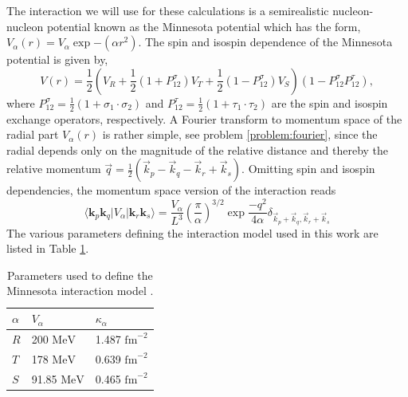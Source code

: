 The interaction we will use for these calculations is a semirealistic nucleon-nucleon potential known as the Minnesota potential \cite{minnesota} which has the form, $V_{\alpha}\left( r\right)=V_{\alpha}\exp{-(\alpha r^{2})}$. The spin and isospin dependence of the Minnesota potential is given by,
\begin{equation}
V\left( r\right)=\frac{1}{2}\left( V_{R}+\frac{1}{2}\left( 1+P_{12}^{\sigma}\right) V_{T}+\frac{1}{2}\left( 1-P_{12}^{\sigma}\right) V_{S}\right)\left( 1-P_{12}^{\sigma}P_{12}^{\tau}\right),
\end{equation}
where $P_{12}^{\sigma}=\frac{1}{2}\left( 1+\sigma_{1}\cdot\sigma_{2}\right)$ and $P_{12}^{\tau}=\frac{1}{2}\left( 1+\tau_{1}\cdot\tau_{2}\right)$ are the spin and isospin exchange operators, respectively. A Fourier transform to momentum space of the radial part $V_{\alpha}\left( r\right)$ is rather simple, see problem \ref{problem:fourier}, since  the radial depends only on the magnitude of the relative distance and thereby the relative momentum $\vec{q}=\frac{1}{2}\left(\vec{k}_{p}-\vec{k}_{q}-\vec{k}_{r}+\vec{k}_{s}\right)$. Omitting spin and isospin dependencies, the momentum space version of the interaction reads
\begin{equation}
\langle \mathbf{k}_p \mathbf{k}_q \vert V_{\alpha}\vert \mathbf{k}_r\mathbf{k}_s\rangle=\frac{V_{\alpha}}{L^{3}}\left(\frac{\pi}{\alpha}\right)^{3/2}\exp{\frac{-q^{2}}{4\alpha}}\delta_{\vec{k}_{p}+\vec{k}_{q},\vec{k}_{r}+\vec{k}_{s}}
\end{equation}
The various parameters defining the interaction model used in this work are listed in Table \ref{tab:minnesotatab}. 
\begin{table}
\caption{Parameters used to define the Minnesota interaction model \cite{minnesota}.}\label{tab:minnesotatab}
\begin{center}
  \begin{tabular}{| l | l | l |}
    \hline
    $\alpha$ & $V_{\alpha}$ & $\kappa_{\alpha}$ \\ \hline
    $R$ & 200 $\mathrm{MeV}$ & 1.487 $\mathrm{fm}^{-2}$ \\ \hline
    $T$ & 178 $\mathrm{MeV}$ & 0.639 $\mathrm{fm}^{-2}$ \\ \hline
    $S$ & 91.85 $\mathrm{MeV}$ & 0.465 $\mathrm{fm}^{-2}$ \\ \hline
  \end{tabular}
\end{center}
\end{table}


